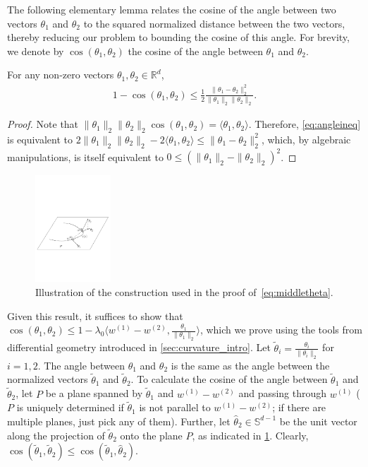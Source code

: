 \documentclass[english]{article}
\newcommand{\real}{\mathbb{R}}
\newcommand{\bS}{\mathbb{S}}
\newcommand{\inpro}[2]{\langle #1, #2\rangle}
\newcommand{\ttheta}{\tilde{\theta}}
\newcommand{\htheta}{\hat{\theta}}
\newcommand{\inangle}[2]{(#1,#2)}
\newenvironment{proofof}[1]{\par\noindent{\bf Proof of #1\ }}{\hfill\BlackBox\\[2mm]}
\begin{document}
\begin{proofof}{\cref{thm:R_curvesurface}}
The following elementary lemma relates the cosine of the angle between two vectors $\theta_1$ and $\theta_2$ to the squared normalized distance between 
the two vectors, thereby reducing our problem to bounding the cosine of this angle.
For brevity, we denote by $\cos\inangle{\theta_1}{\theta_2}$
the cosine of the angle between $\theta_1$ and $\theta_2$. 
\begin{lemma}
\label{lem:upperboundcos}
For any non-zero vectors $\theta_1, \theta_2 \in \real^d$,
\begin{align}
1- \cos \inangle{\theta_1}{\theta_2} \le \frac{1}{2} \frac{\|\theta_1 - \theta_2\|_2^2}{\|\theta_1\|_2\|\theta_2\|_2}.
\label{eq:angleineq}
\end{align}
\end{lemma}
\begin{proof}
Note that $\|\theta_1\|_2\|\theta_2\|_2\cos\inangle{\theta_1}{\theta_2} = \inpro{\theta_1}{\theta_2}$.
Therefore, \eqref{eq:angleineq} is equivalent to 
$ 2\|\theta_1\|_2\|\theta_2\|_2 - 2\inpro{\theta_1}{\theta_2} \le \|\theta_1 - \theta_2\|_2^2 $,
which, by algebraic manipulations, is itself equivalent to $0 \le (\|\theta_1\|_2-\|\theta_2\|_2)^2$.
\end{proof}

\begin{figure}[h]
  \centering
	\includegraphics[height=4cm]{figures/GaussmapPro}
  \caption{Illustration of the construction used in the proof of~\eqref{eq:middletheta}.} 
  \label{fig:cuttingplane}
\end{figure}


Given this result, it suffices to show that $\cos \inangle{\theta_1}{\theta_2} \le 1-\lambda_0 \inpro{w^{(1)}-w^{(2)}}{\frac{\theta_1}{\|\theta_1\|_2}}$, which
we prove using the tools from differential geometry introduced in \cref{sec:curvature_intro}.
Let $\ttheta_i = \frac{\theta_i}{\|\theta_i\|_2}$ for $i=1,2$.
The angle between $\theta_1$ and $\theta_2$ is the same as the angle between 
the normalized vectors $\ttheta_1$ and $\ttheta_2$.
To calculate the cosine of the angle between $\ttheta_1$ and $\ttheta_2$,
let $P$ be a plane spanned by $\ttheta_1$ and $w^{(1)}-w^{(2)}$ and passing through $w^{(1)}$
($P$ is uniquely determined if $\ttheta_1$ is not parallel to $w^{(1)}-w^{(2)}$;
if there are multiple planes, just pick any of them). 
Further, let $\htheta_2\in \bS^{d-1}$ be the unit vector along the projection of $\ttheta_2$ onto the plane $P$, as indicated in \cref{fig:cuttingplane}.
Clearly, $\cos \inangle{\ttheta_1}{\ttheta_2} \le \cos \inangle{\ttheta_1}{\htheta_2}$.



\end{proofof}
\end{document}
